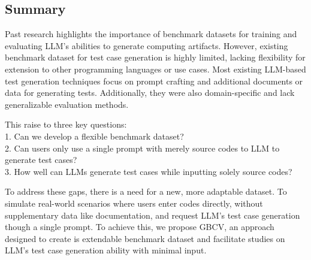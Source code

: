 \subsection{Summary}

Past research highlights the importance of benchmark datasets for training and evaluating LLM’s abilities to generate computing artifacts. However, existing benchmark dataset for test case generation is highly limited, lacking flexibility for extension to other programming languages or use cases. Most existing LLM-based test generation techniques focus on prompt crafting and additional documents or data for generating tests. Additionally, they were also domain-specific and lack generalizable evaluation methods.

This raise to three key questions: \\
1. Can we develop a flexible benchmark dataset? \\
2. Can users only use a single prompt with merely source codes to LLM to generate test cases? \\
3. How well can LLMs generate test cases while inputting solely source codes?

To address these gaps, there is a need for a new, more adaptable dataset. To simulate real-world scenarios where users enter codes directly, without supplementary data like documentation, and request LLM’s test case generation though a single prompt. To achieve this, we propose GBCV, an approach designed to create is extendable benchmark dataset and facilitate studies on LLM’s test case generation ability with minimal input.